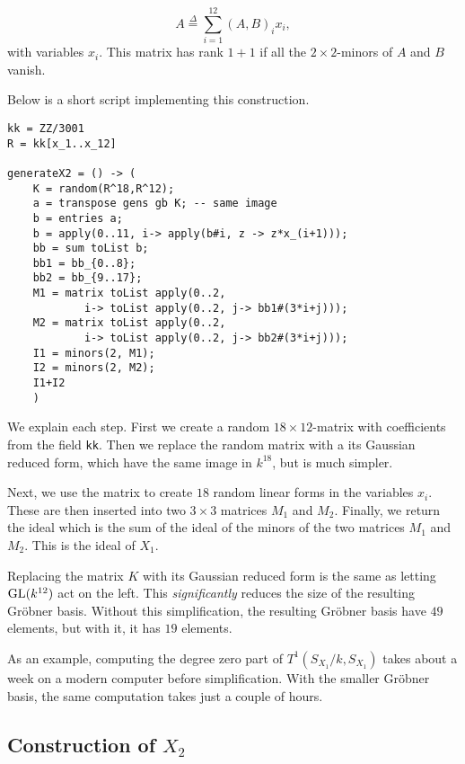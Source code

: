 \[
A \stackrel \Delta = \sum_{i=1}^{12} (A,B)_i x_i,
\]
with variables $x_i$. This matrix has rank $1+1$ if all the $2 \times 2$-minors of $A$ and $B$ vanish. 

Below is a short \MM script implementing this construction.

\begin{lstlisting}[caption = Code for $X_1$, language=Macaulay2]
kk = ZZ/3001
R = kk[x_1..x_12]

generateX2 = () -> (
    K = random(R^18,R^12);
    a = transpose gens gb K; -- same image
    b = entries a;
    b = apply(0..11, i-> apply(b#i, z -> z*x_(i+1)));
    bb = sum toList b;
    bb1 = bb_{0..8};
    bb2 = bb_{9..17};
    M1 = matrix toList apply(0..2,
            i-> toList apply(0..2, j-> bb1#(3*i+j)));
    M2 = matrix toList apply(0..2,
            i-> toList apply(0..2, j-> bb2#(3*i+j)));
    I1 = minors(2, M1);
    I2 = minors(2, M2);
    I1+I2
    )
\end{lstlisting}

We explain each step. First we create a random $18 \times 12$-matrix with coefficients from the field \texttt{kk}. Then we replace the random matrix with a its Gaussian reduced form, which have the same image in $k^{18}$, but is much simpler.

Next, we use the matrix to create $18$ random linear forms in the variables $x_i$. These are then inserted into two $3 \times 3$ matrices $M_1$ and $M_2$. Finally, we return the ideal which is the sum of the ideal of the minors of the two matrices $M_1$ and $M_2$. This is the ideal of $X_1$.



\begin{remark}
Replacing the matrix $K$ with its Gaussian reduced form is the same as letting $\operatorname{GL}(k^{12})$ act on the left. This \emph{significantly} reduces the size of the resulting Gröbner basis. Without this simplification, the resulting Gröbner basis have $49$ elements, but with it, it has $19$ elements.

As an example, computing the degree zero part of $T^1(S_{X_1}/k,S_{X_1})$ takes about a week on a modern computer before simplification. With the smaller Gröbner basis, the same computation takes just a couple of hours.
\end{remark}

\subsection{Construction of $X_2$}

